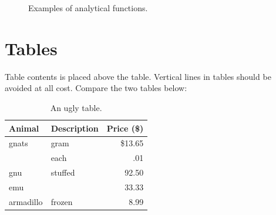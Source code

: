 \begin{figure}[H]
\centering
{}
\caption{Examples of analytical functions.}
\label{analytical}
\end{figure}

\section{Tables}
Table contents is placed above the table. Vertical lines in tables should be avoided at all cost. Compare the two tables below:
\begin{table}[H]
	\begin{center}
		\caption{An ugly table.} \label{tab:ugly}
		\begin{tabular}{||l|lr||}
			Animal     & Description & Price (\$)\\\hline
			gnats     & gram      & \$13.65 \\ \cline{2-3}
			& each      & .01 \\ \hline
			gnu       & stuffed   & 92.50 \\ \cline{1-1} \cline{3-3}
			emu       &           & 33.33 \\ \hline
			armadillo & frozen    & 8.99 \\ \hline
		\end{tabular}
	\end{center}
\end{table}

